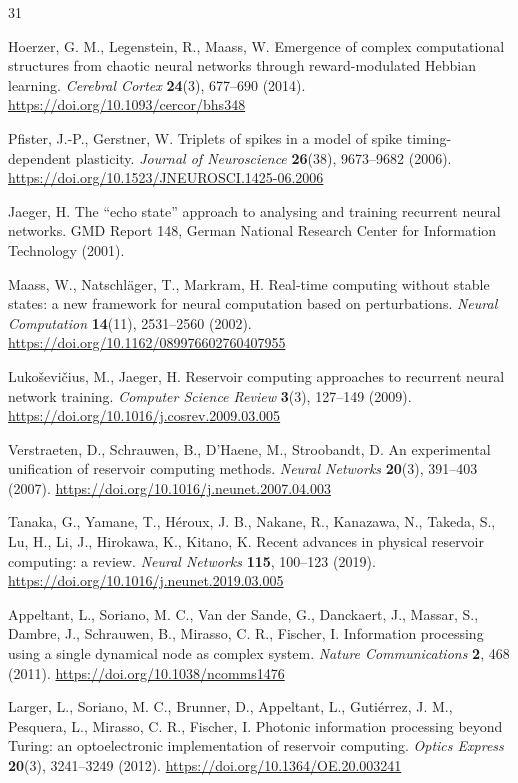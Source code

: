 \documentclass[preprint,12pt]{elsarticle}
\begin{document}
\begin{thebibliography}{31}

 Hoerzer, G. M., Legenstein, R., Maass, W. Emergence of
complex computational structures from chaotic neural networks through
reward-modulated Hebbian learning. \emph{Cerebral Cortex} \textbf{24}(3),
677--690 (2014). \url{https://doi.org/10.1093/cercor/bhs348}

 Pfister, J.-P., Gerstner, W. Triplets of spikes in a
model of spike timing-dependent plasticity. \emph{Journal of
Neuroscience} \textbf{26}(38), 9673--9682 (2006).
\url{https://doi.org/10.1523/JNEUROSCI.1425-06.2006}

 Jaeger, H. The ``echo state'' approach to analysing
and training recurrent neural networks. GMD Report 148, German National
Research Center for Information Technology (2001).

 Maass, W., Natschläger, T., Markram, H. Real-time
computing without stable states: a new framework for neural computation
based on perturbations. \emph{Neural Computation} \textbf{14}(11),
2531--2560 (2002). \url{https://doi.org/10.1162/089976602760407955}

 Lukoševičius, M., Jaeger, H. Reservoir computing
approaches to recurrent neural network training. \emph{Computer Science
Review} \textbf{3}(3), 127--149 (2009).
\url{https://doi.org/10.1016/j.cosrev.2009.03.005}

 Verstraeten, D., Schrauwen, B., D'Haene, M.,
Stroobandt, D. An experimental unification of reservoir computing
methods. \emph{Neural Networks} \textbf{20}(3), 391--403 (2007).
\url{https://doi.org/10.1016/j.neunet.2007.04.003}

 Tanaka, G., Yamane, T., Héroux, J. B., Nakane, R.,
Kanazawa, N., Takeda, S., Lu, H., Li, J., Hirokawa, K., Kitano, K. Recent
advances in physical reservoir computing: a review. \emph{Neural
Networks} \textbf{115}, 100--123 (2019).
\url{https://doi.org/10.1016/j.neunet.2019.03.005}

 Appeltant, L., Soriano, M. C., Van der Sande, G.,
Danckaert, J., Massar, S., Dambre, J., Schrauwen, B., Mirasso, C. R.,
Fischer, I. Information processing using a single dynamical node as
complex system. \emph{Nature Communications} \textbf{2}, 468 (2011).
\url{https://doi.org/10.1038/ncomms1476}

 Larger, L., Soriano, M. C., Brunner, D., Appeltant,
L., Gutiérrez, J. M., Pesquera, L., Mirasso, C. R., Fischer, I. Photonic
information processing beyond Turing: an optoelectronic implementation of
reservoir computing. \emph{Optics Express} \textbf{20}(3), 3241--3249
(2012). \url{https://doi.org/10.1364/OE.20.003241}


\end{thebibliography}
\end{document}
